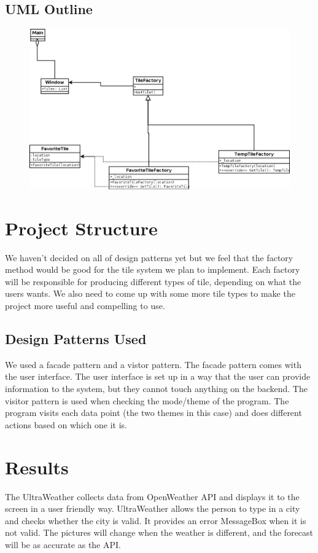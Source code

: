 \documentclass[10pt,conference,onecolumn,compsoc]{IEEEtran}
\begin{document}
\subsection{UML Outline}
\begin{figure}[ht!]
\includegraphics[scale = 0.3]{WeatherApp.png}
\end{figure}

\section{Project Structure}
We haven't decided on all of design patterns yet but we feel that the factory method would be good for the tile system we plan to implement. Each factory will be responsible for producing different types of tile, depending on what the users wants. We also need to come up with some more tile types to make the project more useful and compelling to use.




\subsection{Design Patterns Used}
We used a facade pattern and a vistor pattern. The facade pattern comes with the user interface. The user interface is set up in a way that the user can provide information to the system, but they cannot touch anything on the backend. The visitor pattern is used when checking the mode/theme of the program. The program visits each data point (the two themes in this case) and does different actions based on which one it is. 


\section{Results}
The UltraWeather collects data from OpenWeather API and displays it to the screen in a user friendly way. UltraWeather allows the person to type in a city and checks whether the city is valid. It provides an error MessageBox when it is not valid. The pictures will change when the weather is different, and the forecast will be as accurate as the API.
\end{document}
